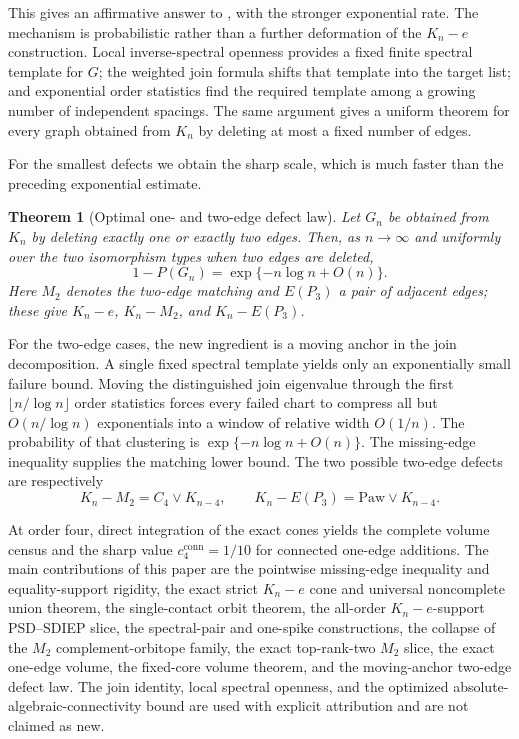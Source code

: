 \documentclass[11pt,reqno]{amsart}
\newtheorem{theorem}{Theorem}[section]
\theoremstyle{definition}
\theoremstyle{remark}
\begin{document}
This gives an affirmative answer to \cite[Question~5]{EJT2026}, with the
stronger exponential rate.  The mechanism is probabilistic rather than a
further deformation of the $K_n-e$ construction.  Local inverse-spectral
openness provides a fixed finite spectral template for $G$; the weighted join
formula shifts that template into the target list; and exponential order
statistics find the required template among a growing number of independent
spacings.  The same argument gives a uniform theorem for every graph obtained
from $K_n$ by deleting at most a fixed number of edges.

For the smallest defects we obtain the sharp scale, which is much faster than
the preceding exponential estimate.

\begin{theorem}[Optimal one- and two-edge defect law]
\label{thm:intro-optimal-defect}
Let $G_n$ be obtained from $K_n$ by deleting exactly one or exactly two
edges.  Then, as $n\to\infty$ and uniformly over the two isomorphism types
when two edges are deleted,
\begin{equation}\label{eq:intro-optimal-defect}
  1-P(G_n)=\exp\{-n\log n+O(n)\}.
\end{equation}
Here $M_2$ denotes the two-edge matching and $E(P_3)$ a pair of adjacent
edges; these give $K_n-e$, $K_n-M_2$, and $K_n-E(P_3)$.
\end{theorem}

For the two-edge cases, the new ingredient is a moving anchor in the join
decomposition.  A single fixed spectral template yields only an exponentially
small failure bound.
Moving the distinguished join eigenvalue through the first
$\lfloor n/\log n\rfloor$ order statistics forces every failed chart to
compress all but $O(n/\log n)$ exponentials into a window of relative width
$O(1/n)$.  The probability of that clustering is
$\exp\{-n\log n+O(n)\}$.  The missing-edge inequality supplies the matching
lower bound.  The two possible two-edge defects are respectively
\[
  K_n-M_2=C_4\vee K_{n-4},\qquad
  K_n-E(P_3)=\mathrm{Paw}\vee K_{n-4}.
\]

At order four, direct integration of the exact cones yields the complete
volume census and the sharp value $c_4^{\mathrm{conn}}=1/10$ for connected
one-edge additions.  The main contributions of this paper are the pointwise
missing-edge inequality and equality-support rigidity, the exact strict
$K_n-e$ cone and universal noncomplete union theorem, the single-contact
orbit theorem, the all-order $K_n-e$-support PSD--SDIEP slice, the
spectral-pair and one-spike constructions, the collapse of the $M_2$
complement-orbitope family, the exact top-rank-two $M_2$ slice, the exact
one-edge volume, the fixed-core volume theorem, and the moving-anchor
two-edge defect law.  The join identity, local spectral openness, and the
optimized absolute-algebraic-connectivity bound are used with explicit
attribution and are not claimed as new.
\end{document}
